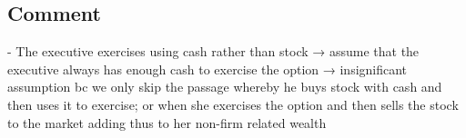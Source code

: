 
\subsection*{Comment}


- The executive exercises using cash rather than stock
    → assume that the executive always has enough cash to exercise the option
    → insignificant assumption bc we only skip the passage whereby he buys stock with cash and then uses it to exercise; or when she exercises the option and then sells the stock to the market adding thus to her non-firm related wealth
